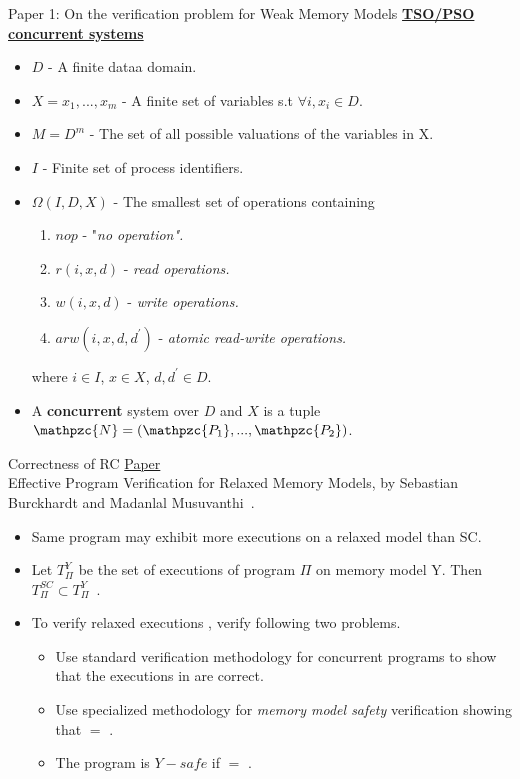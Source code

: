 \documentclass[9pt]{beamer}
\begin{document}
\begin{frame}{Paper 1: On the verification problem for Weak Memory Models}
\underline{\textbf{TSO/PSO concurrent systems}}
\begin{itemize}
\item $D$ - A finite dataa domain.
\item $X = {x_1,...,x_m}$ - A finite set of variables s.t $\forall i, x_i \in D$.
\item $M = D^m$ - The set of all possible valuations of the variables in X.
\item $I$ - Finite set of process identifiers.
\item $\Omega(I,D,X)$ - The smallest set of operations containing
	\begin{enumerate}
	\item $nop$ - "\em{no operation}".
	\item $r(i,x,d)$ - \em{read operations}.
	\item $w(i,x,d)$ - \em{write operations}.
	\item $arw(i,x,d,d^{\prime})$ - \em{atomic read-write operations}.
	\end{enumerate}
	where $i \in I$, $x \in X$, $d,d^{\prime} \in D$.
\item A \textbf{concurrent} system over $D$ and $X$ is a tuple $\mathpzc{N} = 
      (\mathpzc{P_1},...,\mathpzc{P_2})$.
\end{itemize}

\end{frame}
\begin{frame}{Correctness of RC}
\underline{Paper}\\
Effective Program Verification for Relaxed Memory Models, by Sebastian Burckhardt and
Madanlal Musuvanthi~\cite{Burckhardt2008}.
\begin{itemize}
\item Same program may exhibit more executions on
      a relaxed model than SC.
\item Let $T_{\Pi}^Y$ be the set of executions of program $\Pi$ on memory model Y.
        Then $T_{\Pi}^{SC} \subset T_{\Pi}^Y$~.
\item To verify relaxed executions \rlxset{}, verify following two problems.
  \begin{itemize}
  \item Use standard verification methodology for concurrent programs to show that
        the executions in \scset{} are correct.
  \item Use specialized methodology for {\em memory model safety} verification
        showing that \rlxset{} $=$ \scset{}.
  \item The program is $Y-safe$  if \rlxset{} $=$ \scset{}.
  \end{itemize}
\end{itemize}
\end{frame}
\end{document}
